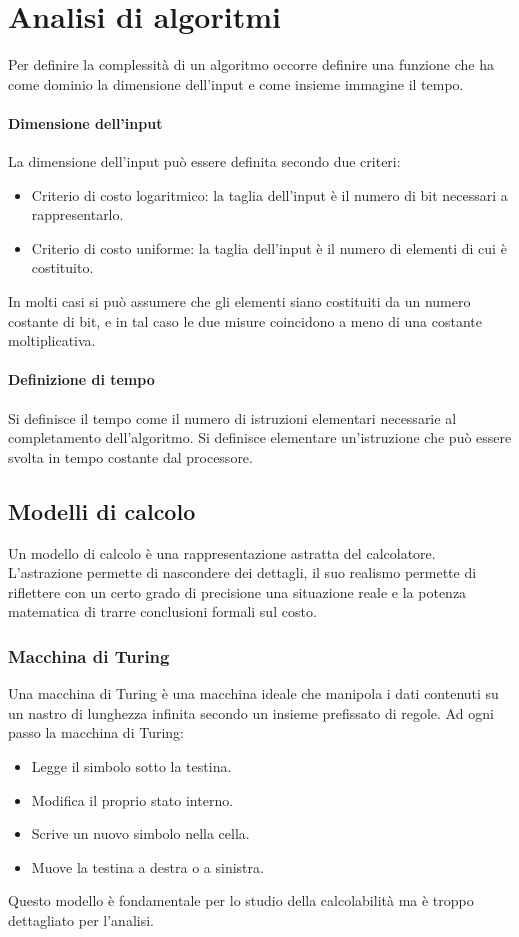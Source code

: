 \chapter{Analisi di algoritmi}
Per definire la complessit\`a di un algoritmo occorre definire una funzione che ha come dominio la dimensione dell'input e come insieme immagine il tempo.
\subsubsection{Dimensione dell'input}
La dimensione dell'input pu\`o essere definita secondo due criteri:
\begin{itemize}
\item Criterio di costo logaritmico: la taglia dell'input \`e il numero di bit necessari a rappresentarlo.
\item Criterio di costo uniforme: la taglia dell'input \`e il numero di elementi di cui \`e costituito.
\end{itemize}
In molti casi si pu\`o assumere che gli elementi siano costituiti da un numero costante di bit, e in tal caso le due misure coincidono a meno di una costante
moltiplicativa.
\subsubsection{Definizione di tempo}
Si definisce il tempo come il numero di istruzioni elementari necessarie al completamento dell'algoritmo. Si definisce elementare un'istruzione che pu\`o 
essere svolta in tempo costante dal processore. 
\section{Modelli di calcolo}
Un modello di calcolo \`e una rappresentazione astratta del calcolatore. L'astrazione permette di nascondere dei dettagli, il suo realismo permette di 
riflettere con un certo grado di precisione una situazione reale e la potenza matematica di trarre conclusioni formali sul costo. 
\subsection{Macchina di Turing}
Una macchina di Turing \`e una macchina ideale che manipola i dati contenuti su un nastro di lunghezza infinita secondo un insieme prefissato di regole. Ad
ogni passo la macchina di Turing:
\begin{itemize}
\item Legge il simbolo sotto la testina.
\item Modifica il proprio stato interno.
\item Scrive un nuovo simbolo nella cella.
\item Muove la testina a destra o a sinistra.
\end{itemize}
Questo modello \`e fondamentale per lo studio della calcolabilit\`a ma \`e troppo dettagliato per l'analisi.
